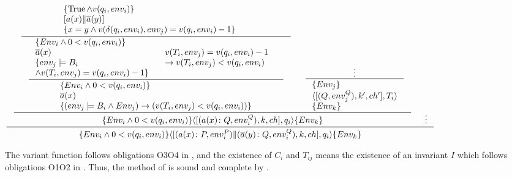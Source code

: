 \documentclass[12pt,a4paper,titlepage]{article}
\theoremstyle{break}
\begin{document}
  \begin{center}
    \begin{math}
\inference{
  \inference{
    \inference{\parbox{76mm}{\(\{\Truerm\wedge v(q_i,env_i)\}\)\\\([a(x)\|\bijection{a}(y)]\)\\
                             \(\{x=y\wedge v(\delta(q_i,env_i),env_j)=v(q_i,env_i)-1\}\)}}
    {\inference{\parbox{48mm}{\(\{Env_i\wedge 0<v(q_i,env_i)\}\)\\
                             \(\bijection{a}(x)\)\\
                             \(\{env_j\models B_i\)\\\(\wedge v(T_i,env_j)=v(q_i,env_i)-1\}\)}&
                  \parbox{46mm}{\(v(T_i,env_j)=v(q_i,env_i)-1\)\\\(->v(T_i,env_j)<v(q_i,env_i)\)}}
               {\parbox{79mm}{\(\{Env_i\wedge 0<v(q_i,env_i)\}\)\\
                              \(\bijection{a}(x)\)\\
                              \(\{(env_j\models B_i\wedge Env_j)->(v(T_i,env_j)<v(q_i,env_i))\}\)}}}&
     \inference{\vdots}
     {\parbox{35mm}{\(\{Env_j\}\)\\
                   \(\langle[(Q,env_j^Q),k',ch'],T_i\rangle\)\\
                   \(\{Env_k\}\)}}}
  {\{Env_i\wedge 0<v(q_i,env_i)\}\langle[(a(x)\colon Q,env_i^Q),k,ch],q_i\rangle\{Env_k\}}&\vdots}
{\{Env_i\wedge 0<v(q_i,env_i)\}\langle[(a(x)\colon P,env_i^P)\|(\bijection{a}(y)\colon Q,env_i^Q),k,ch],q_i\rangle\{Env_k\}}
    \end{math}
  \end{center}

The variant function follows obligations O3\textendash O4 in \cite{Alpern:1989}, and
the existence of \(C_{i}\) and \(T_{ij}\) means the existence of an invariant $I$ which follows obligations O1\textendash O2 in \cite{Alpern:1989}.
Thus, the method of \NHK is sound and complete by \cite{Alpern:1989}.
%
%
\end{document}
